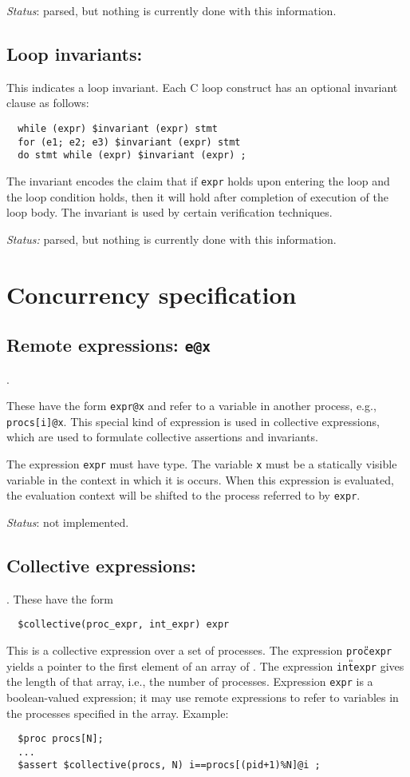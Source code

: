 \emph{Status}: parsed, but nothing is currently done with this
information.

\subsection{Loop invariants: \cinvariant}

This indicates a loop invariant.  Each C loop
construct has an optional invariant clause as follows:
\begin{verbatim}
  while (expr) $invariant (expr) stmt
  for (e1; e2; e3) $invariant (expr) stmt
  do stmt while (expr) $invariant (expr) ;
\end{verbatim}
The invariant encodes the claim that if \texttt{expr} holds upon
entering the loop and the loop condition holds, then it will hold
after completion of execution of the loop body.  The invariant is used
by certain verification techniques.

\emph{Status:} parsed, but nothing is currently done with this
information.



\section{Concurrency specification}

\subsection{Remote expressions: \texttt{e@x}}.

These have the form \verb!expr@x! and refer to a variable in another
process, e.g., \verb!procs[i]@x!. This special kind of expression is
used in collective expressions, which are used to formulate collective
assertions and invariants.

The expression \verb!expr! must have \cproc{} type.  The variable
\texttt{x} must be a statically visible variable in the context in
which it is occurs.  When this expression is evaluated, the evaluation
context will be shifted to the process referred to by \texttt{expr}.

\emph{Status}: not implemented.

\subsection{Collective expressions: \ccollective}.  These have the form
\begin{verbatim}
  $collective(proc_expr, int_expr) expr 
\end{verbatim}
This is a collective expression over a set of processes.  The
expression \texttt{proc{\U}expr} yields a pointer to the first element
of an array of \cproc.  The expression \texttt{int{\U}expr} gives the
length of that array, i.e., the number of processes.  Expression
\texttt{expr} is a boolean-valued expression; it may use remote
expressions to refer to variables in the processes specified in the
array.  Example:
\begin{verbatim}
  $proc procs[N];
  ...
  $assert $collective(procs, N) i==procs[(pid+1)%N]@i ;
\end{verbatim}

